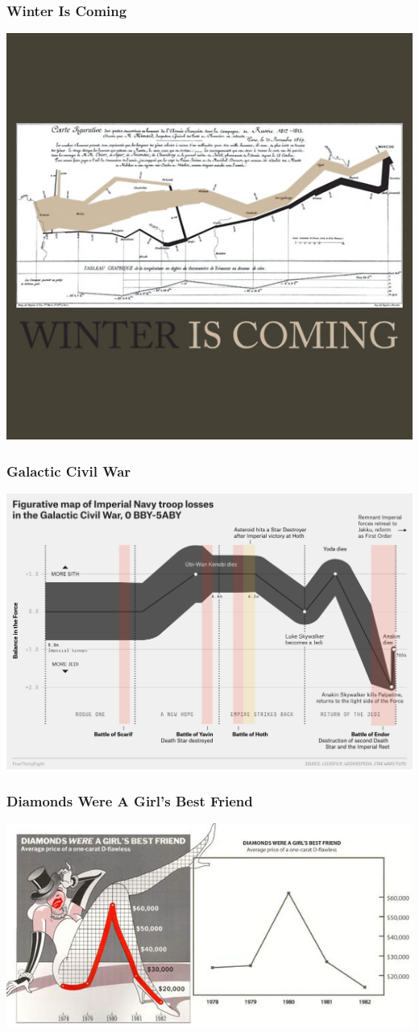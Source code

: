 \documentclass{beamer} %
\begin{document}
\begin{frame}\frametitle{Winter Is Coming}
	\centering
	\includegraphics[width=0.9\linewidth]{winteriscoming.jpg}
\end{frame}



\begin{frame}\frametitle{Galactic Civil War}
	\centering
	\includegraphics[width=\linewidth]{starwars.png}
\end{frame}


\begin{frame}\frametitle{Diamonds Were A Girl's Best Friend}
		\centering
	\includegraphics[width=\linewidth]{diamonds.jpg}
\end{frame}
\end{document}
